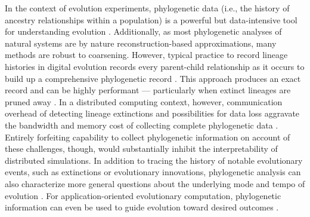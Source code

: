In the context of evolution experiments, phylogenetic data (i.e., the history of ancestry relationships within a population) is a powerful but data-intensive tool for understanding evolution \citep{faithConservationEvaluationPhylogenetic1992, STAMATAKIS2005phylogenetics,frenchHostPhylogenyShapes2023,kim2006discovery,lewinsohnStatedependentEvolutionaryModels2023a,lenski2003evolutionary}.
Additionally, as most phylogenetic analyses of natural systems are by nature reconstruction-based approximations, many methods are robust to coarsening.
However, typical practice to record lineage histories in digital evolution records every parent-child relationship as it occurs to build up a comprehensive phylogenetic record \citep{moreno2024algorithms}.
This approach produces an exact record and can be highly performant --- particularly when extinct lineages are pruned away \citep{dolson2024phylotrackpy}.
In a distributed computing context, however, communication overhead of detecting lineage extinctions and possibilities for data loss aggravate the bandwidth and memory cost of collecting complete phylogenetic data \citep{moreno2024algorithms}.
Entirely forfeiting capability to collect phylogenetic information on account of these challenges, though, would substantially inhibit the interpretability of distributed simulations.
In addition to tracing the history of notable evolutionary events, such as extinctions or evolutionary innovations, phylogenetic analysis can also characterize more general questions about the underlying mode and tempo of evolution \citep{moreno2023toward,hernandez2022can,lewinsohnStatedependentEvolutionaryModels2023a}.
For application-oriented evolutionary computation, phylogenetic information can even be used to guide evolution toward desired outcomes \citep{lalejini2024phylogeny,lalejini2024runtime,shahbandegan2022untangling,murphy2008simple,burke2003increased}.

